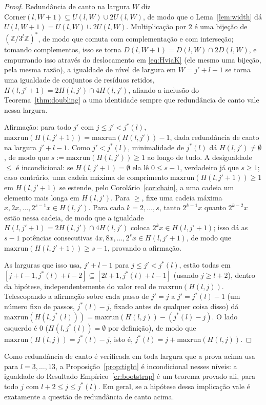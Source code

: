 \documentclass[11pt]{amsart}
\theoremstyle{plain}
\theoremstyle{definition}
\theoremstyle{remark}
\newcommand{\Z}{\mathbb{Z}}
\begin{document}
\begin{proof}
Redundância de canto na largura $W$ diz $\mathrm{Corner}(l,W+1)\subseteq U(l,W)\cup2U(l,W)$, de
modo que o Lema~\ref{lem:width} dá $U(l,W+1)=U(l,W)\cup2U(l,W)$. Multiplicação por $2$ é uma
bijeção de $(\Z/3^l\Z)^*$, de modo que comuta com complementação e com interseção; tomando
complementos, isso se torna $D(l,W+1)=D(l,W)\cap2D(l,W)$, e empurrando isso através do
deslocamento em \eqref{eq:HviaK} (ele mesmo uma bijeção, pela mesma razão), a igualdade de nível de
largura em $W=j'+l-1$ se torna uma igualdade de conjuntos de resíduos retidos,
$H(l,j'+1)=2H(l,j')\cap4H(l,j')$, afiando a inclusão do Teorema~\ref{thm:doubling} a uma identidade
sempre que redundância de canto vale nessa largura.

Afirmação: para todo $j'$ com $j\le j'<j^*(l)$, $\mathrm{maxrun}(H(l,j'+1))=\mathrm{maxrun}(H(l,j'))-1$,
dada redundância de canto na largura $j'+l-1$. Como $j'<j^*(l)$, minimalidade de $j^*(l)$ dá
$H(l,j')\ne\emptyset$, de modo que $s:=\mathrm{maxrun}(H(l,j'))\ge1$ ao longo de tudo. A
desigualdade $\le$ é incondicional: se $H(l,j'+1)=\emptyset$ ela lê $0\le s-1$, verdadeiro já que
$s\ge1$; caso contrário, uma cadeia máxima de comprimento $\mathrm{maxrun}(H(l,j'+1))\ge1$ em
$H(l,j'+1)$ se estende, pelo Corolário~\ref{cor:chain}, a uma cadeia um elemento mais longa em
$H(l,j')$. Para $\ge$, fixe uma cadeia máxima $x,2x,\dots,2^{s-1}x\in H(l,j')$. Para cada
$k=2,\dots,s$, tanto $2^{k-1}x$ quanto $2^{k-2}x$ estão nessa cadeia, de modo que a igualdade
$H(l,j'+1)=2H(l,j')\cap4H(l,j')$ coloca $2^kx\in H(l,j'+1)$; isso dá as $s-1$ potências consecutivas
$4x,8x,\dots,2^sx\in H(l,j'+1)$, de modo que $\mathrm{maxrun}(H(l,j'+1))\ge s-1$, provando a
afirmação.

As larguras que isso usa, $j'+l-1$ para $j\le j'<j^*(l)$, estão todas em
$[j+l-1,j^*(l)+l-2]\subseteq[2l+1,j^*(l)+l-1]$ (usando $j\ge l+2$), dentro da hipótese,
independentemente do valor real de $\mathrm{maxrun}(H(l,j))$. Telescopando a afirmação sobre cada
passo de $j'=j$ a $j'=j^*(l)-1$ (um número fixo de passos, $j^*(l)-j$, fixado antes de qualquer
coisa disso) dá $\mathrm{maxrun}(H(l,j^*(l)))=\mathrm{maxrun}(H(l,j))-(j^*(l)-j)$. O lado esquerdo é
$0$ ($H(l,j^*(l))=\emptyset$ por definição), de modo que $\mathrm{maxrun}(H(l,j))=j^*(l)-j$, isto
é, $j^*(l)=j+\mathrm{maxrun}(H(l,j))$.
\end{proof}

Como redundância de canto é verificada em toda largura que a prova acima usa para $l=3,\dots,13$, a
Proposição~\ref{prop:tight} é incondicional nesses níveis: a igualdade do Resultado
Empírico~\ref{er:bootstrap} é um teorema provado ali, para todo $j$ com $l+2\le j\le j^*(l)$. Em
geral, se a hipótese dessa implicação vale é exatamente a questão de redundância de canto acima.
\end{document}
